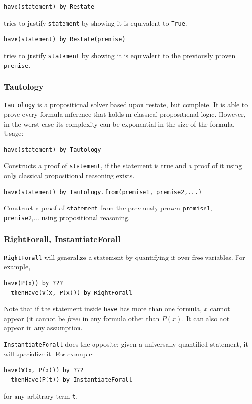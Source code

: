 \begin{lstlisting}[language=lisa]
  have(statement) by Restate
\end{lstlisting}
tries to justify \lstinline|statement| by showing it is equivalent to \lstinline|True|.

\begin{lstlisting}[language=lisa]
  have(statement) by Restate(premise)
\end{lstlisting}
tries to justify \lstinline|statement| by showing it is equivalent to the previously proven \lstinline|premise|.

\subsubsection*{Tautology}\label{tact:Tautology}
\lstinline|Tautology| is a propositional solver based upon restate, but complete. It is able to prove every formula inference that holds in classical propositional logic. However, in the worst case its complexity can be exponential in the size of the formula. Usage:

\begin{lstlisting}[language=lisa]
  have(statement) by Tautology
\end{lstlisting}
Constructs a proof of \lstinline|statement|, if the statement is true and a proof of it using only classical propositional reasoning exists.

\begin{lstlisting}[language=lisa]
  have(statement) by Tautology.from(premise1, premise2,...)
\end{lstlisting}
Construct a proof of \lstinline|statement| from the previously proven \lstinline|premise1|, \lstinline|premise2|,... using propositional reasoning.

\subsubsection*{RightForall, InstantiateForall}
\lstinline|RightForall| will generalize a statement by quantifying it over free variables. For example,
\begin{lstlisting}[language=lisa]
  have(P(x)) by ???
  thenHave(∀(x, P(x))) by RightForall
\end{lstlisting}
Note that if the statement inside \lstinline|have| has more than one formula, $x$ cannot appear (it cannot be \emph{free}) in any formula other than $P(x)$. It can also not appear in any assumption.

\lstinline|InstantiateForall| does the opposite: given a universally quantified statement, it will specialize it. For example:
\begin{lstlisting}[language=lisa]
  have(∀(x, P(x))) by ???
  thenHave(P(t)) by InstantiateForall
\end{lstlisting}
for any arbitrary term \lstinline|t|.

